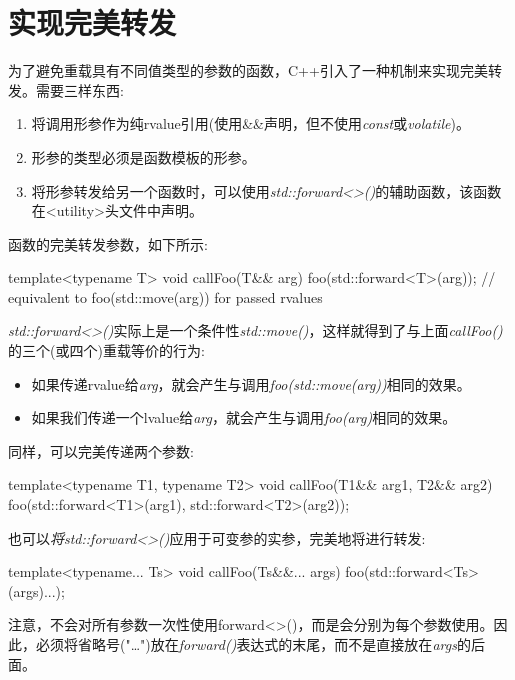 \section{实现完美转发}
为了避免重载具有不同值类型的参数的函数，C++引入了一种机制来实现完美转发。需要三样东西:

\begin{enumerate}
	\item 将调用形参作为纯rvalue引用(使用\&\&声明，但不使用\textit{const}或\textit{volatile})。
	\item 形参的类型必须是函数模板的形参。
	\item 将形参转发给另一个函数时，可以使用\textit{std::forward<>()}的辅助函数，该函数在<utility>头文件中声明。
\end{enumerate}

函数的完美转发参数，如下所示:

\begin{cppcode}
template<typename T>
void callFoo(T&& arg) {
	foo(std::forward<T>(arg)); // equivalent to foo(std::move(arg)) for passed rvalues
}
\end{cppcode}

\textit{std::forward<>()}实际上是一个条件性\textit{std::move()}，这样就得到了与上面\textit{callFoo()}的三个(或四个)重载等价的行为:

\begin{itemize}
	\item 如果传递rvalue给\textit{arg}，就会产生与调用\textit{foo(std::move(arg))}相同的效果。
	\item 如果我们传递一个lvalue给\textit{arg}，就会产生与调用\textit{foo(arg)}相同的效果。
\end{itemize}

同样，可以完美传递两个参数:

\begin{cppcode}
template<typename T1, typename T2>
void callFoo(T1&& arg1, T2&& arg2) {
	foo(std::forward<T1>(arg1), std::forward<T2>(arg2));
}
\end{cppcode}

也可以\textit{将std::forward<>()}应用于可变参的实参，完美地将进行转发:

\begin{cppcode}
template<typename... Ts>
void callFoo(Ts&&... args) {
	foo(std::forward<Ts>(args)...);
}
\end{cppcode}

注意，不会对所有参数一次性使用forward<>()，而是会分别为每个参数使用。因此，必须将省略号("…")放在\textit{forward()}表达式的末尾，而不是直接放在\textit{args}的后面。

